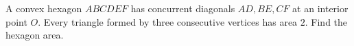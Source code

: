 A convex hexagon $ABCDEF$ has concurrent diagonals $AD,BE,CF$ at an interior point $O$. Every triangle formed by three consecutive vertices has area $2$. Find the hexagon area.

